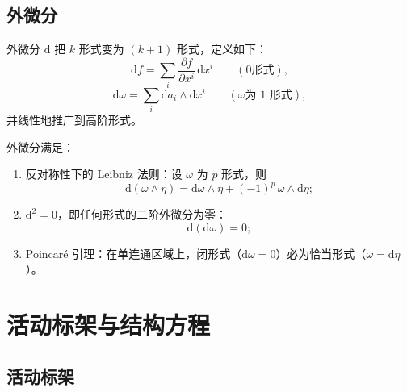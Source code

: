\subsection{外微分}

\begin{definition}[外微分算子]
	外微分 $\mathrm{d}$ 把 $k$ 形式变为 $(k+1)$ 形式，定义如下：
	\begin{equation}
		\mathrm{d}f=\sum_{i}\frac{\partial f}{\partial x^{i}}\,\mathrm{d}x^{i}
		\qquad(0\text{形式}),
		\label{eq:外微分算子:0形式}
	\end{equation}
	\begin{equation}
		\mathrm{d}\omega=\sum_{i}\mathrm{d}a_i\wedge\mathrm{d}x^{i}
		\qquad(\omega\text{为 1 形式}),
		\label{eq:外微分算子:1形式}
	\end{equation}
	并线性地推广到高阶形式。
\end{definition}

\begin{theorem}[外微分的性质]
	外微分满足：
	\begin{enumerate}
		\item 反对称性下的 Leibniz 法则：设 $\omega$ 为 $p$ 形式，则
		\begin{equation}
			\mathrm{d}(\omega\wedge\eta)=\mathrm{d}\omega\wedge\eta+(-1)^{p}\,\omega\wedge\mathrm{d}\eta;
			\label{eq:外微分:Leibniz}
		\end{equation}
		\item $\mathrm{d}^{2}=0$，即任何形式的二阶外微分为零：
		\begin{equation}
			\mathrm{d}(\mathrm{d}\omega)=0;
			\label{eq:外微分:d平方为零}
		\end{equation}
		\item Poincaré 引理：在单连通区域上，闭形式（$\mathrm{d}\omega=0$）必为恰当形式（$\omega=\mathrm{d}\eta$）。
		\label{thm:Poincare引理}
	\end{enumerate}
\end{theorem}

\section{活动标架与结构方程}

\subsection{活动标架}

